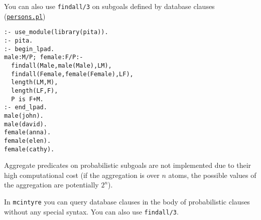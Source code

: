 You can also use \verb|findall/3| on subgoals defined by database clauses
(\href{http://cplint.lamping.unife.it/example/inference/persons.pl}{\texttt{persons.pl}})
\begin{verbatim}
:- use_module(library(pita)).
:- pita.
:- begin_lpad.
male:M/P; female:F/P:-
  findall(Male,male(Male),LM),
  findall(Female,female(Female),LF),
  length(LM,M),
  length(LF,F),
  P is F+M.
:- end_lpad.
male(john).
male(david).
female(anna).
female(elen).
female(cathy).
\end{verbatim}
Aggregate predicates on probabilistic subgoals are not implemented due to their high
computational cost (if the aggregation is over $n$ atoms, the possible values of the
aggregation are potentially $2^n$).

In \verb|mcintyre| you can query database clauses in the body of probabilistic clauses without any special syntax. You can also 
use \verb|findall/3|.